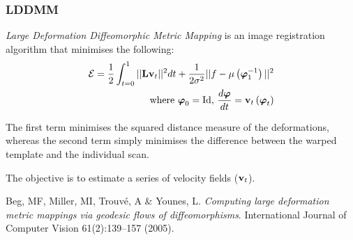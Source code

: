 \begin{frame}
\frametitle{LDDMM}
\emph{Large Deformation Diffeomorphic Metric Mapping} is an image registration algorithm that minimises the following:
\begin{eqnarray*}
\mathcal{E}  =   \frac{1}{2} \int_{t=0}^1  || {\bf L} {\bf v}_t ||^2 dt +
                 \frac{1}{2\sigma^2} || f - \mu\left({\boldsymbol\varphi}_1^{-1}\right)||^2\\
\text{  where } {\boldsymbol\varphi}_0 = \mathrm{Id} \text{, } \frac{d{\boldsymbol\varphi}}{dt} = {\bf v}_t\left({\boldsymbol\varphi}_t\right)
\end{eqnarray*}

The first term minimises the squared distance measure of the deformations, whereas the second term simply minimises the difference between the warped template and the individual scan.

The objective is to estimate a series of velocity fields (${\bf v}_t$).\par
\vspace{.25cm}
\begin{tiny}
Beg, MF, Miller, MI, Trouv{\'e}, A \& Younes, L. \emph{Computing large deformation metric mappings via geodesic flows of diffeomorphisms}. International Journal of Computer Vision 61(2):139--157 (2005).

\end{tiny}

\end{frame}





